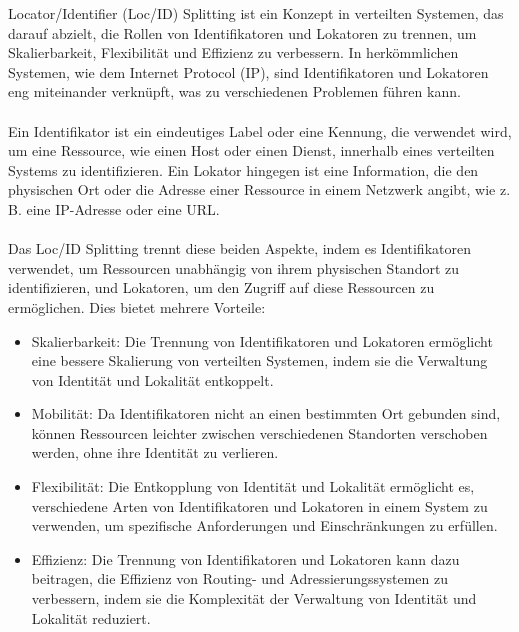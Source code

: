 Locator/Identifier (Loc/ID) Splitting ist ein Konzept in verteilten Systemen, das darauf abzielt, die Rollen von Identifikatoren und Lokatoren zu trennen, um Skalierbarkeit, Flexibilität und Effizienz zu verbessern. In herkömmlichen Systemen, wie dem Internet Protocol (IP), sind Identifikatoren und Lokatoren eng miteinander verknüpft, was zu verschiedenen Problemen führen kann.
\\\\
Ein Identifikator ist ein eindeutiges Label oder eine Kennung, die verwendet wird, um eine Ressource, wie einen Host oder einen Dienst, innerhalb eines verteilten Systems zu identifizieren. Ein Lokator hingegen ist eine Information, die den physischen Ort oder die Adresse einer Ressource in einem Netzwerk angibt, wie z. B. eine IP-Adresse oder eine URL.
\\\\
Das Loc/ID Splitting trennt diese beiden Aspekte, indem es Identifikatoren verwendet, um Ressourcen unabhängig von ihrem physischen Standort zu identifizieren, und Lokatoren, um den Zugriff auf diese Ressourcen zu ermöglichen. Dies bietet mehrere Vorteile:
\begin{itemize}
\item Skalierbarkeit: Die Trennung von Identifikatoren und Lokatoren ermöglicht eine bessere Skalierung von verteilten Systemen, indem sie die Verwaltung von Identität und Lokalität entkoppelt.
\item Mobilität: Da Identifikatoren nicht an einen bestimmten Ort gebunden sind, können Ressourcen leichter zwischen verschiedenen Standorten verschoben werden, ohne ihre Identität zu verlieren.
\item Flexibilität: Die Entkopplung von Identität und Lokalität ermöglicht es, verschiedene Arten von Identifikatoren und Lokatoren in einem System zu verwenden, um spezifische Anforderungen und Einschränkungen zu erfüllen.
\item Effizienz: Die Trennung von Identifikatoren und Lokatoren kann dazu beitragen, die Effizienz von Routing- und Adressierungssystemen zu verbessern, indem sie die Komplexität der Verwaltung von Identität und Lokalität reduziert.
\end{itemize}

